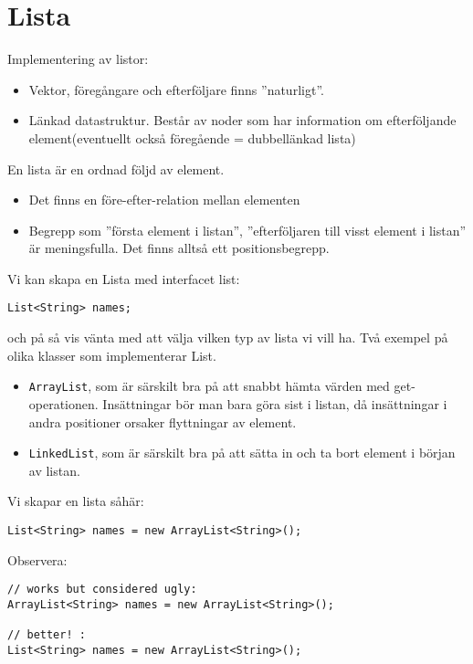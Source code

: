 \documentclass[11pt]{article}
\begin{document}
\section{Lista}
Implementering av listor:
\begin{itemize}
\item{Vektor, föregångare och efterföljare finns ''naturligt''.}
\item{Länkad datastruktur. Består av noder som har information om efterföljande element(eventuellt också föregående = dubbellänkad lista)}
\end{itemize}
En lista är en ordnad följd av element.
\begin{itemize}
\item{Det finns en före-efter-relation mellan elementen}
\item{Begrepp som ''första element i listan'', ''efterföljaren till visst element i listan'' är meningsfulla. Det finns alltså ett positionsbegrepp.}
\end{itemize}
Vi kan skapa en Lista med interfacet list:
\begin{lstlisting}
List<String> names;
\end{lstlisting}
och på så vis vänta med att välja vilken typ av lista vi vill ha.
Två exempel på olika klasser som implementerar List.
\begin{itemize}
\item{ \verb+ArrayList+, som är särskilt bra på att snabbt hämta värden med get-operationen. Insättningar bör man bara göra sist i listan, då insättningar i andra positioner orsaker flyttningar av element.}
\item{ \verb+LinkedList+, som är särskilt bra på att sätta in och ta bort element i början av listan.}
\end{itemize}
Vi skapar en lista såhär:
\begin{lstlisting}
List<String> names = new ArrayList<String>();
\end{lstlisting}
Observera:
\begin{lstlisting}
// works but considered ugly:
ArrayList<String> names = new ArrayList<String>();

// better! :
List<String> names = new ArrayList<String>();
\end{lstlisting}
\end{document}
